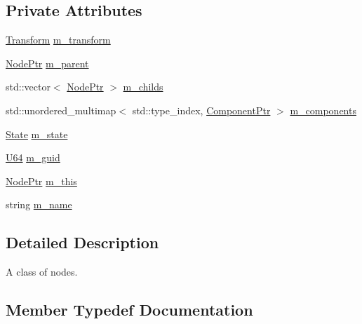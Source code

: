 \subsection*{Private Attributes}
\begin{DoxyCompactItemize}
\item 
\hyperlink{classmage_1_1_transform}{Transform} \hyperlink{classmage_1_1_node_a0f4dd0c46d9713fd64b0e562862afac6}{m\+\_\+transform}
\item 
\hyperlink{classmage_1_1_node_ac575dc006e0ae1134277ade977dc06b6}{Node\+Ptr} \hyperlink{classmage_1_1_node_aa04f166b52fca444c8756c0864a16cde}{m\+\_\+parent}
\item 
std\+::vector$<$ \hyperlink{classmage_1_1_node_ac575dc006e0ae1134277ade977dc06b6}{Node\+Ptr} $>$ \hyperlink{classmage_1_1_node_a1d1d432f46c61932b5167d27d20cc383}{m\+\_\+childs}
\item 
std\+::unordered\+\_\+multimap$<$ std\+::type\+\_\+index, \hyperlink{classmage_1_1_node_a46b7e1f4f5b98bfa78ed96a80797a4ba}{Component\+Ptr} $>$ \hyperlink{classmage_1_1_node_a804d53398f193b6b06f883131ab7415d}{m\+\_\+components}
\item 
\hyperlink{namespacemage_ae47d13d8477ee94893b9a3947d28eebc}{State} \hyperlink{classmage_1_1_node_a76b775e32bb001c54a9927461eaf7926}{m\+\_\+state}
\item 
\hyperlink{namespacemage_a6672cf3c861707ce4a3235a3eb43941d}{U64} \hyperlink{classmage_1_1_node_a3ef1876293074bfcc01104eb92f1bfdf}{m\+\_\+guid}
\item 
\hyperlink{classmage_1_1_node_ac575dc006e0ae1134277ade977dc06b6}{Node\+Ptr} \hyperlink{classmage_1_1_node_ab056e1563dca22433efa152f4b6da46f}{m\+\_\+this}
\item 
string \hyperlink{classmage_1_1_node_a476cc21fa65cdf9bde0f11fe08b5a707}{m\+\_\+name}
\end{DoxyCompactItemize}


\subsection{Detailed Description}
A class of nodes. 

\subsection{Member Typedef Documentation}
\hypertarget{classmage_1_1_node_a46b7e1f4f5b98bfa78ed96a80797a4ba}{}\label{classmage_1_1_node_a46b7e1f4f5b98bfa78ed96a80797a4ba} 
